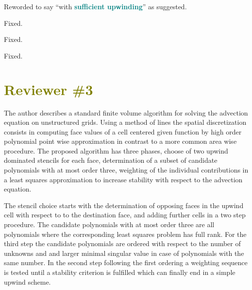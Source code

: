 \documentclass[times]{elsarticle}
\newcommand{\revtwo}[1]{\textcolor{teal}{\textbf{#1}}}
\newcommand{\revthree}[1]{\textcolor{olive}{\textbf{#1}}}
\begin{document}
\begin{quotation}
\begin{comment}
\item P3 below (2): `stable ... with some upwinding'. Presumably some qualification is required
(with sufficient upwinding)?
\end{comment}
\end{quotation}
Reworded to say ``with \revtwo{sufficient upwinding}'' as suggested.

\begin{quotation}
\begin{comment}
\item P5 footnote: could be made
\end{comment}
\end{quotation}
Fixed.

\begin{quotation}
\begin{comment}
\item P14 5 lines from the bottom: cubic should be cubicFit?
\end{comment}
\end{quotation}
Fixed.

\begin{quotation}
\begin{comment}
\item P18 2 lines from the bottom: imprinting in
\end{comment}
\end{quotation}
Fixed.


\section*{\revthree{Reviewer \#3}}
The author describes  a standard finite volume algorithm for solving the advection equation on unstructured
grids. Using a method of lines the spatial discretization consists in computing face values of a cell
centered given function by high order polynomial point wise approximation in contrast to a more common
area wise procedure. The proposed algorithm has three phases, choose of two upwind dominated stencils
for each face, determination of a subset of candidate polynomials with at most order three, weighting
of the individual contributions in a least squares approximation to increase stability with respect 
to the advection equation.

The stencil choice starts with the determination of opposing faces in the upwind cell with respect to 
to the destination face, and adding further cells in a two step procedure. The candidate polynomials
with at most order three are all polynomials where the corresponding least squares problem has full rank.
For the third step the candidate polynomials are ordered with respect to the number of unknowns and 
and larger minimal singular value in case of polynomials with the same number. In the second step
following the first ordering a weighting sequence is tested until a stability criterion is fulfilled
which can finally end in a simple upwind scheme. 
\end{document}
